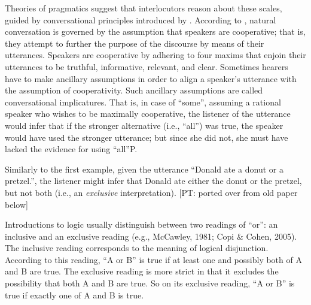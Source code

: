 \documentclass{sp}
\newcommand{\pt}[1]{\textcolor{Cerulean}{[PT: #1]}}
\begin{document}
Theories of pragmatics suggest that interlocutors reason about these scales, guided by conversational principles introduced by \citet{grice1975logic}.
According to \citet{grice1975logic}, natural conversation is governed by
the assumption that speakers are cooperative; that is, they attempt to further the purpose
of the discourse by means of their utterances. Speakers are cooperative by adhering
to four maxims that enjoin their utterances to be truthful, informative, relevant,
and clear. Sometimes hearers have to make ancillary assumptions in order to align a
speaker’s utterance with the assumption of cooperativity. Such ancillary assumptions
are called conversational implicatures.
That is, in case of ``some'', assuming a rational speaker who wishes to be maximally cooperative, the listener of the utterance would infer that if the stronger alternative (i.e., ``all'') was true, the speaker would have used the stronger utterance; but since she did not, she must have lacked the evidence for using ``all''P.

Similarly to the first example, given the utterance “Donald ate a donut or a pretzel.”, the listener might infer that Donald ate either the donut or the pretzel, but not both (i.e., an \textit{exclusive} interpretation).
\pt{ported over from old paper below}
 
Introductions to logic usually distinguish between two readings of “or”: an inclusive
and an exclusive reading (e.g., McCawley, 1981; Copi \& Cohen, 2005). The inclusive
reading corresponds to the meaning of logical disjunction. According to this reading,
“A or B” is true if at least one and possibly both of A and B are true. The exclusive
reading is more strict in that it excludes the possibility that both A and B are true. So
on its exclusive reading, “A or B” is true if exactly one of A and B is true. 
\end{document}
